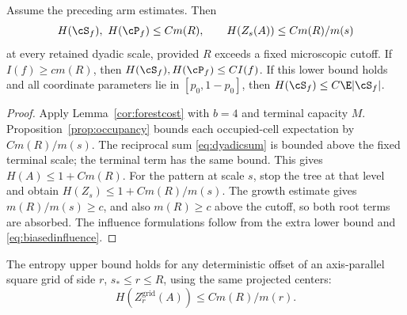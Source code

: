 \begin{theorem}\label{thm:armcriterion}
Assume the preceding arm estimates. Then
\begin{equation}\label{eq:armcriterion}
 H(\cS_f),\ H(\cP_f)\le C m(R),\qquad
 H(Z_s(A))\le C m(R)/m(s)
\end{equation}
at every retained dyadic scale, provided $R$ exceeds a fixed microscopic cutoff. If $I(f)\ge c m(R)$, then $H(\cS_f),H(\cP_f)\le CI(f)$. If this lower bound holds and all coordinate parameters lie in $[p_0,1-p_0]$, then $H(\cS_f)\le C\E|\cS_f|$.
\end{theorem}
\begin{proof}
Apply Lemma~\ref{cor:forestcost} with $b=4$ and terminal capacity $M$. Proposition~\ref{prop:occupancy} bounds each occupied-cell expectation by $Cm(R)/m(s)$. The reciprocal sum \eqref{eq:dyadicsum} is bounded above the fixed terminal scale; the terminal term has the same bound. This gives $H(A)\le1+Cm(R)$. For the pattern at scale $s$, stop the tree at that level and obtain $H(Z_s)\le1+Cm(R)/m(s)$. The growth estimate gives $m(R)/m(s)\ge c$, and also $m(R)\ge c$ above the cutoff, so both root terms are absorbed. The influence formulations follow from the extra lower bound and \eqref{eq:biasedinfluence}.
\end{proof}

\begin{corollary}\label{cor:grids}
The entropy upper bound holds for any deterministic offset of an axis-parallel square grid of side $r$, $s_*\le r\le R$, using the same projected centers:
\[
 H(Z_r^{\mathrm{grid}}(A))\le C m(R)/m(r).
\]
\end{corollary}
